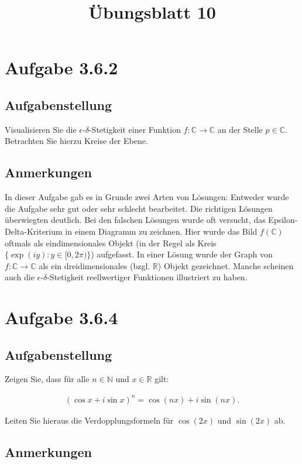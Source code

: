 \documentclass[a4paper]{article}
\title{Übungsblatt 10}
\date{}
\author{}
\newcommand*{\R}{\mathbb R}
\newcommand*{\N}{\mathbb N}
\newcommand*{\C}{\mathbb C}
\begin{document}
\maketitle

\section{Aufgabe 3.6.2}

\subsection{Aufgabenstellung}

Visualisieren Sie die $\epsilon$-$\delta$-Stetigkeit einer Funktion $f:\C\to\C$ an der Stelle $p\in \C$. Betrachten Sie hierzu Kreise der Ebene.

\subsection{Anmerkungen}

In dieser Aufgabe gab es in Grunde zwei Arten von Lösungen: Entweder wurde die Aufgabe sehr gut oder sehr schlecht bearbeitet. Die richtigen Lösungen überwiegten deutlich. Bei den falschen Lösungen wurde oft versucht, das Epsilon-Delta-Kriterium in einem Diagramm zu zeichnen. Hier wurde das Bild $f(\C)$ oftmals als eindimensionales Objekt (in der Regel als Kreis $\{\exp(iy): y\in[0,2\pi)\}$) aufgefasst. In einer Lösung wurde der Graph von $f:\C\to\C$ als ein dreidimensionales (bzgl. $\R$) Objekt gezeichnet. Manche scheinen auch die $\epsilon$-$\delta$-Stetigkeit reellwertiger Funktionen illustriert zu haben.

\section{Aufgabe 3.6.4}

\subsection{Aufgabenstellung}

Zeigen Sie, dass für alle $n\in\N$ und $x\in\R$ gilt:

\begin{align}
  (\cos x+i\sin x)^n = \cos(nx)+i\sin(nx).
\end{align}

Leiten Sie hieraus die Verdopplungsformeln für $\cos(2x)$ und $\sin(2x)$ ab.

\subsection{Anmerkungen}
\end{document}
